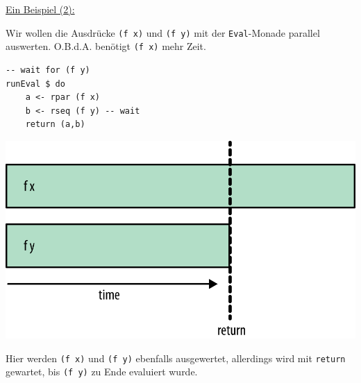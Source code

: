 \documentclass{beamer}
\begin{document}

\begin{frame}[fragile]
\underline{Ein Beispiel (2):}\smallskip

Wir wollen die Ausdrücke \texttt{(f x)} und \texttt{(f y)} mit der \texttt{Eval}-Monade parallel auswerten. O.B.d.A. benötigt \texttt{(f x)} mehr Zeit.

\begin{multicols}{2}
\begin{verbatim}
-- wait for (f y)
runEval $ do
    a <- rpar (f x)
    b <- rseq (f y) -- wait
    return (a,b)
\end{verbatim}
\columnbreak
\pause
\includegraphics[scale=0.7]{evalmonad_02.png}
\end{multicols}
\pause

Hier werden \texttt{(f x)} und \texttt{(f y)} ebenfalls ausgewertet,
allerdings wird mit \texttt{return} gewartet, bis \texttt{(f y)} zu Ende evaluiert wurde.
\end{frame}


\end{document}
